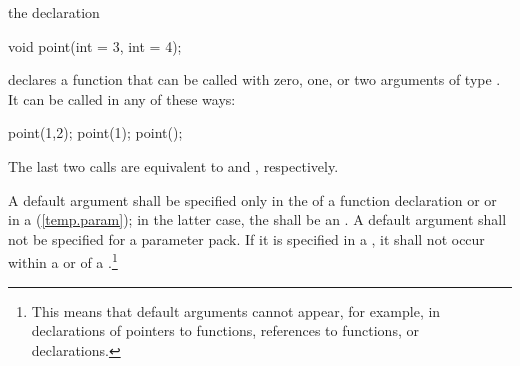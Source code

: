 \pnum
{}%
\begin{example}
the declaration

\begin{codeblock}
void point(int = 3, int = 4);
\end{codeblock}

declares a function that can be called with zero, one, or two arguments of type
.
It can be called in any of these ways:

\begin{codeblock}
point(1,2);  point(1);  point();
\end{codeblock}

The last two calls are equivalent to
and
,
respectively.
\end{example}

\pnum
A default argument shall be specified only in the
of a function declaration
or 
or in a
(\ref{temp.param});
in the latter case, the  shall be an
.
A default argument shall not be specified for a parameter pack.
If it is specified in a
,
it shall not occur within a
or
of a
.\footnote{This means that default
arguments cannot appear,
for example, in declarations of pointers to functions,
references to functions, or
declarations.
}

